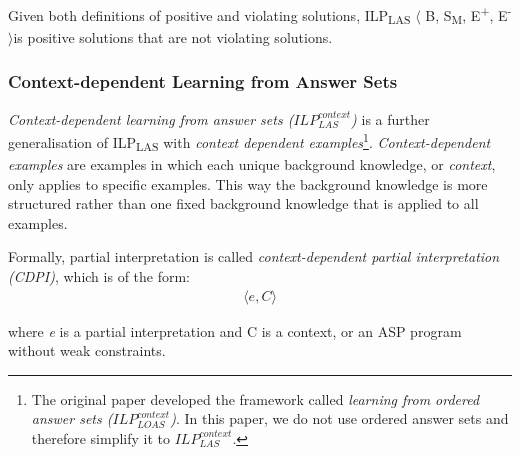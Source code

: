 \documentclass[11pt,twoside]{report}
\theoremstyle{plain}
\theoremstyle{definition}
\begin{document}
Given both definitions of positive and violating solutions, ILP\textsubscript{LAS} $\langle$ B, S\textsubscript{M}, E\textsuperscript{+}, E\textsuperscript{-} $\rangle$is positive solutions that are not violating solutions.


\subsubsection{Context-dependent Learning from Answer Sets }
\textit{Context-dependent learning from answer sets ($ILP_{LAS}^{context}$)} is a further generalisation of ILP\textsubscript{LAS} with \textit{context dependent examples}\cite{Law2016}\footnote{The original paper developed the framework called \textit{learning from ordered answer sets ($ILP_{LOAS}^{context}$)}. 
In this paper, we do not use ordered answer sets and therefore simplify it to $ILP_{LAS}^{context}$. }.
\textit{Context-dependent examples} are examples in which each unique background knowledge, or \textit{context}, only applies to specific examples. 
This way the background knowledge is more structured rather than one fixed background knowledge that is applied to all examples.

Formally, partial interpretation is called \textit{context-dependent partial interpretation (CDPI)}, which is of the form:
\begin{equation} \label{eq:cdpi}
\begin{split}
\langle e, C \rangle
\end{split}
\end{equation}

where \textit{e} is a partial interpretation and C is a context, or an ASP program without weak constraints.

\end{document}
